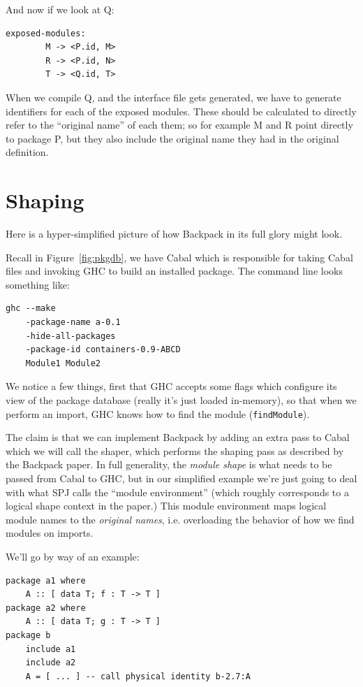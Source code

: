 \documentclass{article}
\begin{document}
And now if we look at Q\@:

\begin{verbatim}
exposed-modules:
        M -> <P.id, M>
        R -> <P.id, N>
        T -> <Q.id, T>
\end{verbatim}

When we compile Q, and the interface file gets generated, we have
to generate identifiers for each of the exposed modules.  These should
be calculated to directly refer to the ``original name'' of each them;
so for example M and R point directly to package P, but they also
include the original name they had in the original definition.

\section{Shaping}\label{sec:shaping}

Here is a hyper-simplified picture of how Backpack in its full glory might look.

Recall in Figure~\ref{fig:pkgdb}, we have Cabal which is responsible for
taking Cabal files and invoking GHC to build an installed package.  The
command line looks something like:

\begin{verbatim}
ghc --make
    -package-name a-0.1
    -hide-all-packages
    -package-id containers-0.9-ABCD
    Module1 Module2
\end{verbatim}

We notice a few things, first that GHC accepts some flags which
configure its view of the package database (really it's just loaded
in-memory), so that when we perform an import, GHC knows how to find the
module (\verb|findModule|).

The claim is that we can implement Backpack by adding an extra pass
to Cabal which we will call the shaper, which performs the shaping pass
as described by the Backpack paper.  In full generality, the \emph{module shape}
is what needs to be passed from Cabal to GHC, but in our simplified example
we're just going to deal with what SPJ calls the ``module environment'' (which
roughly corresponds to a logical shape context in the paper.)  This module
environment maps logical module names to the \emph{original names}, i.e.
overloading the behavior of how we find modules on imports.

We'll go by way of an example:

\begin{verbatim}
package a1 where
    A :: [ data T; f : T -> T ]
package a2 where
    A :: [ data T; g : T -> T ]
package b
    include a1
    include a2
    A = [ ... ] -- call physical identity b-2.7:A
\end{verbatim}
\end{document}
